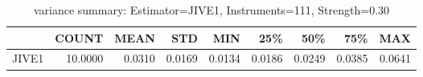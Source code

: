 \begin{table}[ht]
\centering
\caption{variance summary: Estimator=JIVE1, Instruments=111, Strength=0.30}
\begin{tabular}{lrrrrrrrr}
\toprule
 & COUNT & MEAN & STD & MIN & 25\% & 50\% & 75\% & MAX \\
\midrule
JIVE1 & 10.0000 & 0.0310 & 0.0169 & 0.0134 & 0.0186 & 0.0249 & 0.0385 & 0.0641 \\
\bottomrule
\end{tabular}
\end{table}
